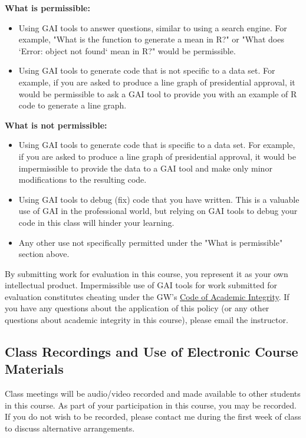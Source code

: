 \documentclass[12pt,letterpaper]{article}
\begin{document}
\textbf{What is permissible:}

\begin{itemize}
    \item Using GAI tools to answer questions, similar to using a search engine. For example, "What is the function to generate a mean in R?" or "What does `Error: object not found` mean in R?" would be permissible.
    \item Using GAI tools to generate code that is not specific to a data set. For example, if you are asked to produce a line graph of presidential approval, it would be permissible to ask a GAI tool to provide you with an example of R code to generate a line graph.
\end{itemize}

\textbf{What is not permissible:}

\begin{itemize}
    \item Using GAI tools to generate code that is specific to a data set. For example, if you are asked to produce a line graph of presidential approval, it would be impermissible to provide the data to a GAI tool and make only minor modifications to the resulting code.
    \item Using GAI tools to debug (fix) code that you have written. This is a valuable use of GAI in the professional world, but relying on GAI tools to debug your code in this class will hinder your learning.
    \item Any other use not specifically permitted under the "What is permissible" section above.
\end{itemize}

By submitting work for evaluation in this course, you represent it as your own intellectual product. Impermissible use of GAI tools for work submitted for evaluation constitutes cheating under the GW's \href{https://students.gwu.edu/code-academic-integrity}{Code of Academic Integrity}. If you have any questions about the application of this policy (or any other questions about academic integrity in this course), please email the instructor.

\subsection*{Class Recordings and Use of Electronic Course Materials}

Class meetings will be audio/video recorded and made available to other students in this course. As part of your participation in this course, you may be recorded. If you do not wish to be recorded, please contact me during the first week of class to discuss alternative arrangements. \par
\end{document}
